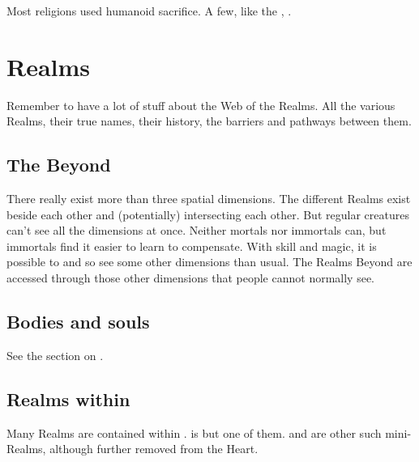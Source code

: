 Most religions used humanoid sacrifice.
A few, like the \iquinians, .















\section{Realms}
Remember to have a lot of stuff about the Web of the Realms. 
All the various Realms, their true names, their history, the barriers and pathways between them. 









\subsection{The Beyond}
There really exist more than three spatial dimensions. 
The different Realms exist beside each other and (potentially) intersecting each other. 
But regular creatures can't see all the dimensions at once. 
Neither mortals nor immortals can, but immortals find it easier to learn to compensate. 
With skill and magic, it is possible to  and so see some other dimensions than usual. 
The Realms Beyond are accessed through those other dimensions that people cannot normally see. 









\subsection{Bodies and souls}
See the section on . 









\subsection{Realms within \Miith}
Many Realms are contained within \Miith{}. 
 is but one of them. 
\Nyx{} and \Machai{} are other such mini-Realms, although further removed from the Heart. 

